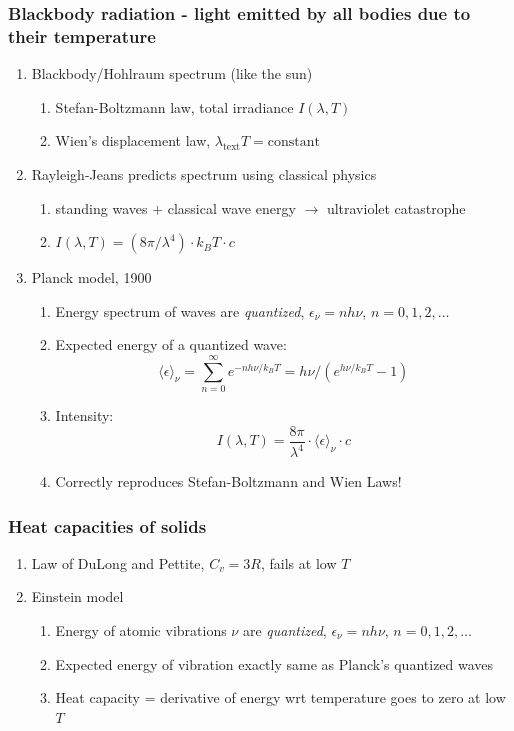 \documentclass[11pt]{article}
\begin{document}
\subsubsection{Blackbody radiation - light emitted by all bodies due to their temperature}
\label{sec:orga6851f5}
\begin{enumerate}
\item Blackbody/Hohlraum spectrum (like the sun)
\begin{enumerate}
\item Stefan-Boltzmann law, total irradiance \(I(\lambda,T)\)
\item Wien's displacement law, \(\lambda_\mathrm{text}T = \mathrm{constant}\)
\end{enumerate}
\item Rayleigh-Jeans predicts spectrum using classical physics
\begin{enumerate}
\item standing waves + classical wave energy \(\rightarrow\) ultraviolet catastrophe
\item \(I(\lambda, T) = (8\pi/\lambda^4) \cdot k_B T \cdot c\)
\end{enumerate}
\item Planck model, 1900
\begin{enumerate}
\item Energy spectrum of waves are \emph{quantized}, \(\epsilon_\nu=nh\nu\), \(n = 0,1,2, \ldots\)
\item Expected energy of a quantized wave: 
\[\langle \epsilon \rangle_\nu = \sum_{n=0}^\infty e^{-nh\nu/k_BT} = h\nu/\left (
          e^{h\nu/k_BT}-1 \right )\]
\item Intensity:
\[I(\lambda, T) = \frac{8\pi}{\lambda^4} \cdot \langle\epsilon \rangle_\nu \cdot c \]
\item Correctly reproduces Stefan-Boltzmann and Wien Laws!
\end{enumerate}
\end{enumerate}
\subsubsection{Heat capacities of solids}
\label{sec:org69a3a04}
\begin{enumerate}
\item Law of DuLong and Pettite, \(C_v = 3R\), fails at low \(T\)
\item Einstein model
\begin{enumerate}
\item Energy of atomic vibrations \(\nu\) are \emph{quantized}, \(\epsilon_\nu=nh\nu\), \(n = 0,1,2, \ldots\)
\item Expected energy of vibration exactly same as Planck's quantized waves
\item Heat capacity = derivative of energy wrt temperature goes to zero at low \(T\)
\end{enumerate}
\end{enumerate}
\end{document}
